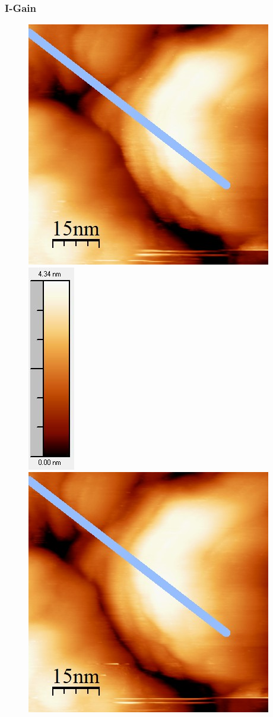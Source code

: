 \documentclass[12pt,a4paper]{article}
\begin{document}
\subsubsection{I-Gain}
\begin{figure}[H]
\centering
\includegraphics[scale=0.6]{Bilder/Anhang/IGain/1000_IGain_vor.jpg}
\includegraphics[scale=0.6]{Bilder/Anhang/IGain/1000_IGain_vor_Skala.jpg}
\includegraphics[scale=0.6]{Bilder/Anhang/IGain/1000_IGain_nach.jpg}

\end{figure}
\end{document}

